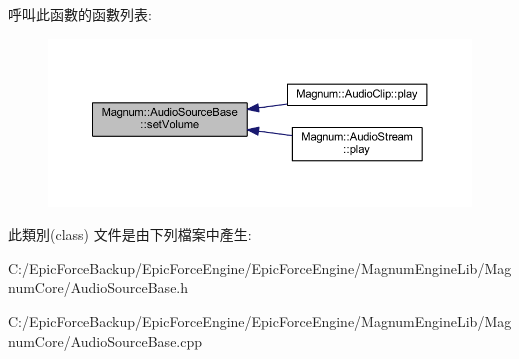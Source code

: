 呼叫此函數的函數列表\+:\nopagebreak
\begin{figure}[H]
\begin{center}
\leavevmode
\includegraphics[width=350pt]{class_magnum_1_1_audio_source_base_a0115bbd05b13cc7b53a4561adf532782_icgraph}
\end{center}
\end{figure}




此類別(class) 文件是由下列檔案中產生\+:\begin{DoxyCompactItemize}
\item 
C\+:/\+Epic\+Force\+Backup/\+Epic\+Force\+Engine/\+Epic\+Force\+Engine/\+Magnum\+Engine\+Lib/\+Magnum\+Core/Audio\+Source\+Base.\+h\item 
C\+:/\+Epic\+Force\+Backup/\+Epic\+Force\+Engine/\+Epic\+Force\+Engine/\+Magnum\+Engine\+Lib/\+Magnum\+Core/Audio\+Source\+Base.\+cpp\end{DoxyCompactItemize}
